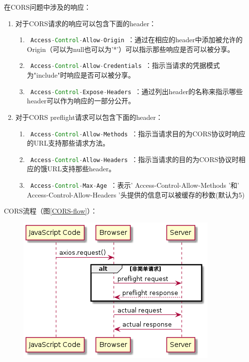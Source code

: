 \begin{enumerate}
\begin{enumerate}
        \end{enumerate}
        在CORS问题中涉及的响应：
        \begin{enumerate}
          \item 对于CORS请求的响应可以包含下面的header：
                \begin{enumerate}
                  \item \lstinline[language = Java]| Access-Control-Allow-Origin |：通过在相应的header中添加被允许的Origin（可以为null也可以为'*'）可以指示那些响应是否可以被分享。
                  \item \lstinline[language = Java]| Access-Control-Allow-Credentials |：指示当请求的凭据模式为"include"时响应是否可以被分享。
                  \item \lstinline[language = Java]| Access-Control-Expose-Headers |：通过列出header的名称来指示哪些header可以作为响应的一部分公开。
                \end{enumerate}
          \item 对于CORS preflight请求可以包含下面的header：
                \begin{enumerate}
                  \item \lstinline[language = Java]| Access-Control-Allow-Methods |：指示当请求目的为CORS协议时响应的URL支持那些请求方法。
                  \item \lstinline[language = Java]| Access-Control-Allow-Headers |：指示当请求的目的为CORS协议时相应的饿URL支持那些header。
                  \item \lstinline[language = Java]| Access-Control-Max-Age |：表示' Access-Control-Allow-Methods '和' Access-Control-Allow-Headers '头提供的信息可以被缓存的秒数(默认为5)
                \end{enumerate}
        \end{enumerate}
        CORS流程（图\ref{CORS-flow}）：
        \begin{figure}[htbp]
          \centering
          \includegraphics[scale = 0.6]{out/uml/时序图/CORS-flow/CORS-flow.png}

\end{figure}
\end{enumerate}
